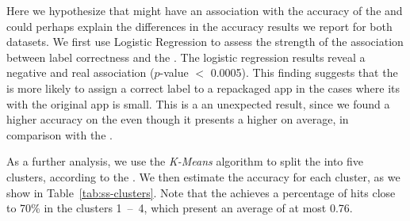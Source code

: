 
Here we hypothesize that \sscore might have an
association with the accuracy of the \mas and could perhaps explain
the differences in the accuracy results we report for both
datasets. We first use Logistic Regression to assess the strength
of the association between label correctness and
the \sscore. The logistic regression results reveal
a negative and real association ($p$-value $<$ 0.0005). This finding suggests
that the \mas is more likely to assign a correct label to
a repackaged app in the cases where its \sscore with the original
app is small. This is a an unexpected result, since
we found a higher accuracy on the \sds even though
it presents a higher \sscore on average, in comparison with the \cds. 


As a further analysis, we use the \emph{K-Means} algorithm to split the
\cds into five clusters, according to the \sscore. We then
estimate the accuracy for each cluster, as
we show in Table~\ref{tab:ss-clusters}. Note that the \mas
achieves a percentage of hits close to 70\% in the clusters 1~--~4, which
present an average \sscore of at most 0.76.





